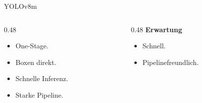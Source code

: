 \begin{frame}{YOLOv8m}
\small
\begin{columns}[T,onlytextwidth]
\begin{column}{0.48\textwidth}
\begin{itemize}
    \item One-Stage.
    \item Boxen direkt.
    \item Schnelle Inferenz.
    \item Starke Pipeline.
\end{itemize}
\end{column}
\begin{column}{0.48\textwidth}
\textbf{Erwartung}
\begin{itemize}
    \item Schnell.
    \item Pipelinefreundlich.
\end{itemize}
\end{column}
\end{columns}
\end{frame}
